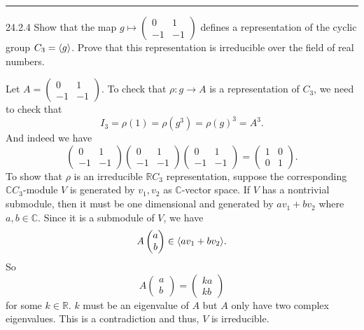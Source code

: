 \documentclass[a4paper, 12pt]{article}
\begin{document}
\noindent\rule{7in}{2.8pt}
\begin{problem}{24.2.4}
Show that the map \(g\mapsto \begin{pmatrix}
	0&1\\ 
	-1&-1
\end{pmatrix}\) defines a representation of the cyclic group \(C_3=\langle g\rangle\). Prove that this representation is irreducible over the field of real numbers.
\end{problem}
\begin{solution}
Let \(A=\begin{pmatrix}
	0&1\\ 
	-1&-1
\end{pmatrix}\). To check that \(\rho:g\rightarrow A\) is a representation of \(C_3\), we need to check that 
\[I_3=\rho(1)=\rho(g^3)=\rho(g)^3=A^3.\]
And indeed we have
\[\begin{pmatrix}
	0&1\\ 
	-1&-1
\end{pmatrix}\begin{pmatrix}
	0&1\\ 
	-1&-1
\end{pmatrix}\begin{pmatrix}
	0&1\\ 
	-1&-1
\end{pmatrix}=\begin{pmatrix}
	1&0\\ 
	0&1
\end{pmatrix}.\]
To show that \(\rho\) is an irreducible \(\mathbb{R}C_3\) representation, suppose the corresponding \(\mathbb{C}C_3\)-module \(V\) is generated by \(v_1,v_2\) as \(\mathbb{C}\)-vector space. If \(V\) 
has a nontrivial submodule, then it must be one dimensional and generated by \(av_1+bv_2\) where \(a,b\in \mathbb{C}\). Since it is a submodule of \(V\), we have 
\[A\begin{pmatrix}
	a\\ 
	b
\end{pmatrix}\in \langle av_1+bv_2\rangle.\]
So 
\[A\begin{pmatrix}
	a\\ 
	b
\end{pmatrix}=\begin{pmatrix}
	ka\\ 
	kb
\end{pmatrix}\]
for some \(k\in \mathbb{R}\). \(k\) must be an eigenvalue of \(A\) but \(A\) only have two complex eigenvalues. This is a contradiction and thus, \(V\) is irreducible.
\end{solution}
\end{document}
